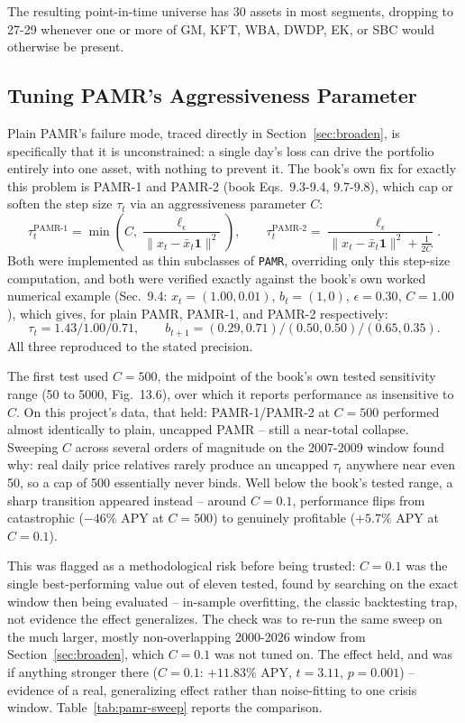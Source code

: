 \documentclass[11pt]{article}
\begin{document}
The resulting point-in-time universe has 30 assets in most segments,
dropping to 27-29 whenever one or more of GM, KFT, WBA, DWDP, EK, or SBC
would otherwise be present.

\subsection{Tuning PAMR's Aggressiveness Parameter}
\label{sec:pamr-tuning}

Plain PAMR's failure mode, traced directly in
Section~\ref{sec:broaden}, is specifically that it is unconstrained: a
single day's loss can drive the portfolio entirely into one asset, with
nothing to prevent it. The book's own fix for exactly this problem is
PAMR-1 and PAMR-2 (book Eqs.~9.3-9.4, 9.7-9.8), which cap or soften the
step size $\tau_t$ via an aggressiveness parameter $C$:
\[
    \tau_t^{\text{PAMR-1}} = \min\!\left(C, \frac{\ell_\epsilon}{\lVert x_t - \bar{x}_t \mathbf{1} \rVert^2}\right),
    \qquad
    \tau_t^{\text{PAMR-2}} = \frac{\ell_\epsilon}{\lVert x_t - \bar{x}_t \mathbf{1} \rVert^2 + \frac{1}{2C}}.
\]
Both were implemented as thin subclasses of \texttt{PAMR}, overriding
only this step-size computation, and both were verified exactly against
the book's own worked numerical example (Sec.~9.4: $x_t=(1.00,0.01)$,
$b_t=(1,0)$, $\epsilon=0.30$, $C=1.00$), which gives, for plain PAMR,
PAMR-1, and PAMR-2 respectively:
\[
    \tau_t = 1.43 / 1.00 / 0.71, \qquad
    b_{t+1} = (0.29,0.71) / (0.50,0.50) / (0.65,0.35).
\]
All three reproduced to the stated precision.

The first test used $C=500$, the midpoint of the book's own tested
sensitivity range (50 to 5000, Fig.~13.6), over which it reports
performance as insensitive to $C$. On this project's data, that held:
PAMR-1/PAMR-2 at $C=500$ performed almost identically to plain,
uncapped PAMR -- still a near-total collapse. Sweeping $C$ across
several orders of magnitude on the 2007-2009 window found why: real
daily price relatives rarely produce an uncapped $\tau_t$ anywhere near
even 50, so a cap of 500 essentially never binds. Well below the book's
tested range, a sharp transition appeared instead -- around $C=0.1$,
performance flips from catastrophic ($-46\%$ APY at $C=500$) to
genuinely profitable ($+5.7\%$ APY at $C=0.1$).

This was flagged as a methodological risk before being trusted: $C=0.1$
was the single best-performing value out of eleven tested, found by
searching on the exact window then being evaluated -- in-sample
overfitting, the classic backtesting trap, not evidence the effect
generalizes. The check was to re-run the same sweep on the much larger,
mostly non-overlapping 2000-2026 window from
Section~\ref{sec:broaden}, which $C=0.1$ was not tuned on. The effect
held, and was if anything stronger there ($C=0.1$: $+11.83\%$ APY,
$t=3.11$, $p=0.001$) -- evidence of a real, generalizing effect rather
than noise-fitting to one crisis window. Table~\ref{tab:pamr-sweep}
reports the comparison.
\end{document}
